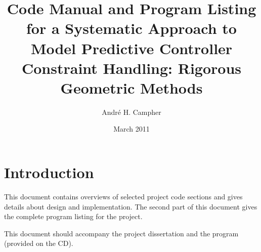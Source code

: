 \documentclass[a4paper,12pt,pdftex]{article}
\title{Code Manual and Program Listing for a Systematic Approach to Model Predictive Controller Constraint 
  Handling: Rigorous Geometric Methods}
\author{Andr\'e H. Campher}
\date{March 2011}
\begin{document}
\maketitle
\bigskip
\tableofcontents

\newpage

\section{Introduction}
This document contains overviews of selected project code sections and gives details about design and implementation.
The second part of this document gives the complete program listing for the project.

This document should accompany the project dissertation and the program (provided on the CD).





\end{document}
